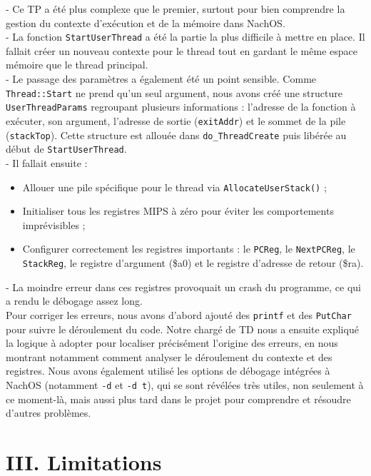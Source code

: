 \documentclass[12pt,a4paper]{report}
\begin{document}
- Ce TP a été plus complexe que le premier, surtout pour bien comprendre la gestion du contexte d’exécution et de la mémoire dans NachOS. \\
- La fonction \texttt{StartUserThread} a été la partie la plus difficile à mettre en place. Il fallait créer un nouveau contexte pour le thread tout en gardant le même espace mémoire que le thread principal. \\
- Le passage des paramètres a également été un point sensible. Comme \texttt{Thread::Start} ne prend qu’un seul argument, nous avons créé une structure \texttt{UserThreadParams} regroupant plusieurs informations : l’adresse de la fonction à exécuter, son argument, l’adresse de sortie (\texttt{exitAddr}) et le sommet de la pile (\texttt{stackTop}). Cette structure est allouée dans \texttt{do\_ThreadCreate} puis libérée au début de \texttt{StartUserThread}. \\
- Il fallait ensuite :
    \begin{itemize}
        \item Allouer une pile spécifique pour le thread via \texttt{AllocateUserStack()} ;
        \item Initialiser tous les registres MIPS à zéro pour éviter les comportements imprévisibles ;
        \item Configurer correctement les registres importants : le \texttt{PCReg}, le \texttt{NextPCReg}, le \texttt{StackReg}, le registre d’argument (\$a0) et le registre d’adresse de retour (\$ra). \\
    \end{itemize}
- La moindre erreur dans ces registres provoquait un crash du programme, ce qui a rendu le débogage assez long. \\
 
Pour corriger les erreurs, nous avons d’abord ajouté des \texttt{printf} et des \texttt{PutChar} pour suivre le déroulement du code.
Notre chargé de TD nous a ensuite expliqué la logique à adopter pour localiser précisément l’origine des erreurs, en nous montrant notamment comment analyser le déroulement du contexte et des registres.
Nous avons également utilisé les options de débogage intégrées à NachOS (notamment \texttt{-d} et \texttt{-d t}), qui se sont révélées très utiles, non seulement à ce moment-là, mais aussi plus tard dans le projet pour comprendre et résoudre d’autres problèmes.


\section*{III. Limitations}
\end{document}
